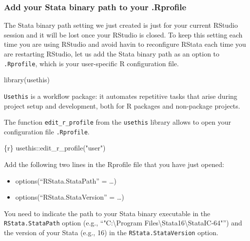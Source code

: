 \documentclass[
  letterpaper,
  DIV=11,
  numbers=noendperiod]{scrreprt}
\newenvironment{Shaded}{\begin{snugshade}}{\end{snugshade}}
\newcommand{\FunctionTok}[1]{\textcolor[rgb]{0.28,0.35,0.67}{#1}}
\newcommand{\InformationTok}[1]{\textcolor[rgb]{0.37,0.37,0.37}{#1}}
\newcommand{\NormalTok}[1]{\textcolor[rgb]{0.00,0.23,0.31}{#1}}
\newcommand{\SpecialCharTok}[1]{\textcolor[rgb]{0.37,0.37,0.37}{#1}}
\newcommand{\StringTok}[1]{\textcolor[rgb]{0.13,0.47,0.30}{#1}}
\providecommand{\tightlist}{%
  \setlength{\itemsep}{0pt}\setlength{\parskip}{0pt}}\usepackage{longtable,booktabs,array}
\begin{document}
\hypertarget{add-your-stata-binary-path-to-your-.rprofile}{%
\subsubsection{Add your Stata binary path to your
.Rprofile}\label{add-your-stata-binary-path-to-your-.rprofile}}

The Stata binary path setting we just created is just for your current
RStudio session and it will be lost once your RStudio is closed. To keep
this setting each time you are using RStudio and avoid havin to
reconfigure RStata each time you are restarting RStudio, let us add the
Stata binary path as an option to \texttt{.Rprofile}, which is your
user-specific R configuration file.

\begin{Shaded}
\begin{Highlighting}[]
\FunctionTok{library}\NormalTok{(usethis)}
\end{Highlighting}
\end{Shaded}

\texttt{Usethis} is a workflow package: it automates repetitive tasks
that arise during project setup and development, both for R packages and
non-package projects.

The function \texttt{edit\_r\_profile} from the \texttt{usethis} library
allows to open your configuration file \texttt{.Rprofile}.

\begin{Shaded}
\begin{Highlighting}[]
\InformationTok{\textasciigrave{}\textasciigrave{}\textasciigrave{}\{r\}}
\NormalTok{usethis}\SpecialCharTok{::}\FunctionTok{edit\_r\_profile}\NormalTok{(}\StringTok{"user"}\NormalTok{)}
\InformationTok{\textasciigrave{}\textasciigrave{}\textasciigrave{}}
\end{Highlighting}
\end{Shaded}

Add the following two lines in the Rprofile file that you have just
opened:

\begin{itemize}
\tightlist
\item
  options(``RStata.StataPath'' = \ldots)
\item
  options(``RStata.StataVersion'' = \ldots)
\end{itemize}

You need to indicate the path to your Stata binary executable in the
\texttt{RStata.StataPath} option (e.g., ``"C:\textbackslash Program
Files\textbackslash Stata16\textbackslash StataIC-64"'') and the version
of your Stata (e.g., 16) in the \texttt{RStata.StataVersion} option.
\end{document}
